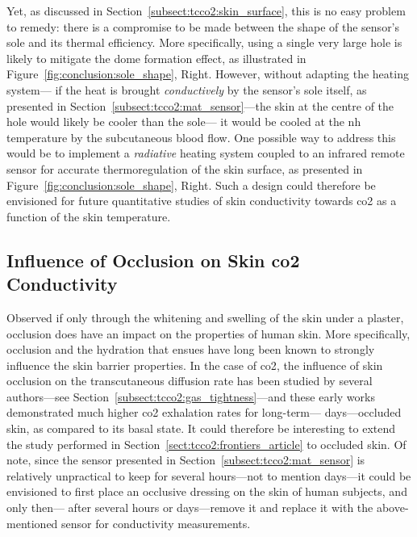 Yet, as discussed in Section~\ref{subsect:tcco2:skin_surface}, this is no easy problem to remedy: there is a compromise to be made between the shape of the sensor's sole and its thermal efficiency. More specifically, using a single very large hole is likely to mitigate the dome formation effect, as illustrated in Figure~\ref{fig:conclusion:sole_shape}, Right. However, without adapting the heating system---\ie{} if the heat is brought \emph{conductively} by the sensor's sole itself, as presented in Section~\ref{subsect:tcco2:mat_sensor}---the skin at the centre of the hole would likely be cooler than the sole---\ie{} it would be cooled at the \gls{nh} temperature by the subcutaneous blood flow. One possible way to address this would be to implement a \emph{radiative} heating system coupled to an infrared remote sensor for accurate thermoregulation of the skin surface, as presented in Figure~\ref{fig:conclusion:sole_shape}, Right. Such a design could therefore be envisioned for future quantitative studies of skin conductivity towards \eg{} \gls{co2} as a function of the skin temperature.

\subsection{Influence of Occlusion on Skin \texorpdfstring{\gls{co2}}{CO2} Conductivity}

Observed if only through the whitening and swelling of the skin under a plaster, occlusion does have an impact on the properties of human skin. More specifically, occlusion and the hydration that ensues have long been known to strongly influence the skin barrier properties\cite{zhai2002}. In the case of \gls{co2}, the influence of skin occlusion on the transcutaneous diffusion rate has been studied by several authors\cite{frame1972, king1978, faergemann1983}---see Section~\ref{subsect:tcco2:gas_tightness}---and these early works demonstrated much higher \gls{co2} exhalation rates for long-term---\ie{} days---occluded skin, as compared to its basal state. It could therefore be interesting to extend the study performed in Section~\ref{sect:tcco2:frontiers_article} to occluded skin. Of note, since the sensor presented in Section~\ref{subsect:tcco2:mat_sensor} is relatively unpractical to keep for several hours---not to mention days---it could be envisioned to first place an occlusive dressing on the skin of human subjects, and only then---\ie{} after several hours or days---remove it and replace it with the above-mentioned sensor for conductivity measurements.

